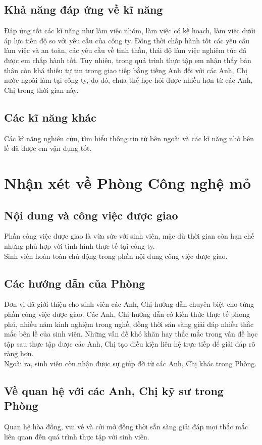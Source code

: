 \documentclass[12pt,a4paper]{report}
\begin{document}
\subsection{Khả năng đáp ứng về kĩ năng}
Đáp ứng tốt các kĩ năng như làm việc nhóm, làm việc có kế hoạch, làm việc dưới áp lực tiến độ so với yêu cầu của công ty. Đồng thời chấp hành tốt các yêu cầu làm việc và an toàn, các yêu cầu về tinh thần, thái độ làm việc nghiêm túc đã được em chấp hành tốt. Tuy nhiên, trong quá trình thực tập em nhận thấy bản thân còn khá thiếu tự tin trong giao tiếp bằng tiếng Anh đối với các Anh, Chị nước ngoài làm tại công ty, do đó, chưa thể học hỏi được nhiều hơn từ các Anh, Chị trong thời gian này.
\subsection{Các kĩ năng khác}
Các kĩ năng nghiên cứu, tìm hiểu thông tin từ bên ngoài và các kĩ năng nhỏ bên lề đã được em vận dụng tốt.
\section{Nhận xét về Phòng Công nghệ mỏ}
\subsection{Nội dung và công việc được giao}
Phần công việc được giao là vừa sức với sinh viên, mặc dù thời gian còn hạn chế nhưng phù hợp với tình hình thực tế tại công ty.\\
Sinh viên hoàn toàn chủ động trong phần nội dung công việc được giao.
\subsection{Các hướng dẫn của Phòng}
Đơn vị đã giới thiệu cho sinh viên các Anh, Chị hướng dẫn chuyên biệt cho từng phần công việc được giao. Các Anh, Chị hướng dẫn có kiến thức thực tế phong phú, nhiều năm kinh nghiệm trong nghề, đồng thời săn sàng giải đáp nhiều thắc mắc bên lề của sinh viên. Những vấn đề khó khăn hay thắc mắc trong vấn đề học tập sau thực tập được các Anh, Chị tạo điều kiện liên hệ trực tiếp để giải đáp rõ ràng hơn.\\
Ngoài ra, sinh viên còn nhận được sự giúp đỡ từ các Anh, Chị khác trong Phòng.
\subsection{Về quan hệ với các Anh, Chị kỹ sư trong Phòng}
Quan hệ hòa đồng, vui vẻ và cởi mở đồng thời sẵn sàng giải đáp mọi thắc mắc liên quan đến quá trình thực tập với sinh viên.
\end{document}
